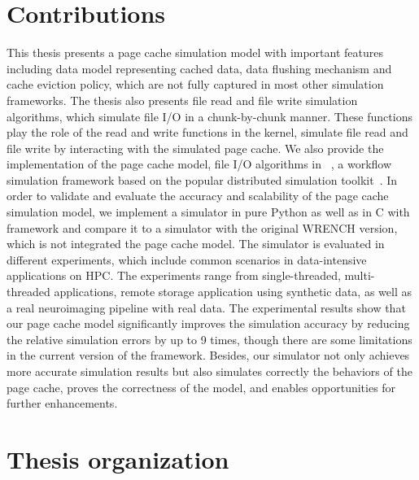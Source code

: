 \section{Contributions}

This thesis presents a page cache simulation model with important features 
including data model representing cached data, data flushing mechanism and 
cache eviction policy, which are not fully captured in most  other 
simulation frameworks. 
The thesis also presents file read and file write simulation algorithms, 
which simulate file I/O in a chunk-by-chunk manner. 
These functions play the role of the read and write functions in the kernel, 
simulate file read and file write by interacting with the simulated page cache.
We also provide the implementation of the page cache model, 
file I/O algorithms in \wrench~\cite{casanova2020fgcs}, 
a workflow simulation framework based on the popular 
\simgrid distributed simulation toolkit~\cite{casanova2014simgrid}. 
In order to validate and evaluate the accuracy and scalability of the page cache 
simulation model, we implement a simulator in pure Python as well as 
in C with \wrench framework and compare it to a simulator with the original 
WRENCH version, which is not integrated the page cache model. 
The simulator is evaluated in different experiments, which include common 
scenarios in data-intensive applications on HPC.
The experiments range from single-threaded, multi-threaded applications, 
remote storage application using synthetic data, as well as a real neuroimaging 
pipeline with real data.
The experimental results show that our page cache model significantly improves 
the simulation accuracy by reducing the relative simulation errors by up to 9 times, 
though there are some limitations in the current version of the \simgrid framework. 
Besides, our simulator not only achieves more accurate simulation results 
but also simulates correctly the behaviors of the page cache, proves the correctness 
of the model, and enables opportunities for further enhancements. 

\section{Thesis organization}

